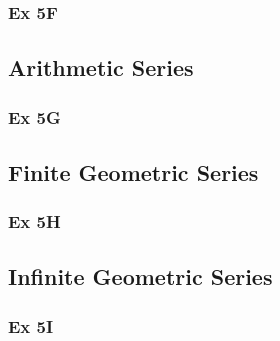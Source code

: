 \documentclass[12pt]{article}
\begin{document}
\subsubsection{Ex 5F}
\subsection{Arithmetic Series}
\subsubsection{Ex 5G}
\subsection{Finite Geometric Series}
\subsubsection{Ex 5H}
\subsection{Infinite Geometric Series}
\subsubsection{Ex 5I}
\end{document}
